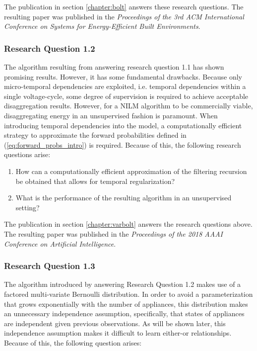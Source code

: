 \documentclass[11pt]{cmuthesis} %
\begin{document}
The publication in section \ref{chapter:bolt} answers these research questions. The resulting paper was published in the \emph{Proceedings of the 3rd ACM International Conference on Systems for Energy-Efficient Built Environments}.

\newpage
\subsubsection{Research Question 1.2}
The algorithm resulting from answering research question 1.1 has shown promising results. However, it has some fundamental drawbacks. Because only micro-temporal dependencies are exploited, i.e. temporal dependencies within a single voltage-cycle, some degree of supervision is required to achieve acceptable disaggregation results. However, for a NILM algorithm to be commercially viable, disaggregating energy in an unsupervised fashion is paramount. When introducing temporal dependencies into the model, a computationally efficient strategy to approximate the forward probabilities defined in (\ref{eq:forward_probs_intro}) is required. Because of this, the following research questions arise:

\begin{enumerate}
\item How can a computationally efficient approximation of the filtering recursion be obtained that allows for temporal regularization?
\item What is the performance of the resulting algorithm in an unsupervised setting?
\end{enumerate}

The publication in section \ref{chapter:varbolt} answers the research questions above. The resulting paper was published in the \emph{Proceedings of the 2018 AAAI Conference on Artificial Intelligence}.

\newpage
\subsubsection{Research Question 1.3}

The algorithm introduced by answering Research Question 1.2 makes use of a factored multi-variate Bernoulli distribution. In order to avoid a parameterization that grows exponentially with the number of appliances, this distribution makes an unnecessary independence assumption, specifically, that states of appliances are independent given previous observations. As will be shown later, this independence assumption makes it difficult to learn either-or relationships. Because of this, the following question arises:
\end{document}
